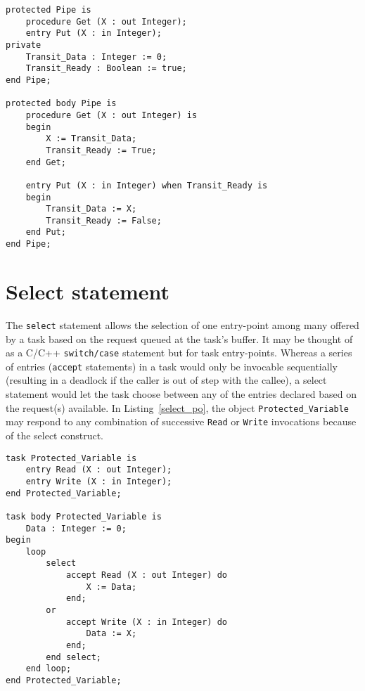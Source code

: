 \begin{minipage}{\listingwidth}
\lstset{language=ada}
\begin{lstlisting}[caption=Pipe IPC construct for two multiple tasks
    with a buffer size of 1,label=prod_consumer]
protected Pipe is
	procedure Get (X : out Integer);
	entry Put (X : in Integer);
private
	Transit_Data : Integer := 0;
	Transit_Ready : Boolean := true;
end Pipe;

protected body Pipe is
	procedure Get (X : out Integer) is
	begin
		X := Transit_Data;		
		Transit_Ready := True;
	end Get;

	entry Put (X : in Integer) when Transit_Ready is
	begin
		Transit_Data := X;
		Transit_Ready := False;
	end Put;
end Pipe;
\end{lstlisting}
\end{minipage}

\section{Select statement}
The \texttt{select} statement allows the selection of one entry-point
among many offered by a task based on the request queued at the task's
buffer. It may be thought of as a C/C++ \texttt{switch/case} statement
but for task entry-points. Whereas a series of entries
(\texttt{accept} statements) in a task would only be invocable
sequentially (resulting in a deadlock if the caller is out of step
with the callee), a select statement would let the task choose between
any of the entries declared based on the request(s) available. In
Listing~\ref{select_po}, the object \texttt{Protected\_Variable} may
respond to any combination of successive \texttt{Read} or
\texttt{Write} invocations because of the select construct.

\begin{minipage}{\listingwidth}
\lstset{language=ada}
\begin{lstlisting}[caption=Protected variable implemented as a task
    with select entries,label=select_po]
task Protected_Variable is
	entry Read (X : out Integer);
	entry Write (X : in Integer);
end Protected_Variable;

task body Protected_Variable is
	Data : Integer := 0;		
begin
	loop
		select
			accept Read (X : out Integer) do
				X := Data;
			end;
		or
			accept Write (X : in Integer) do
				Data := X;
			end;
		end select;
	end loop;
end Protected_Variable;
\end{lstlisting}
\end{minipage}
